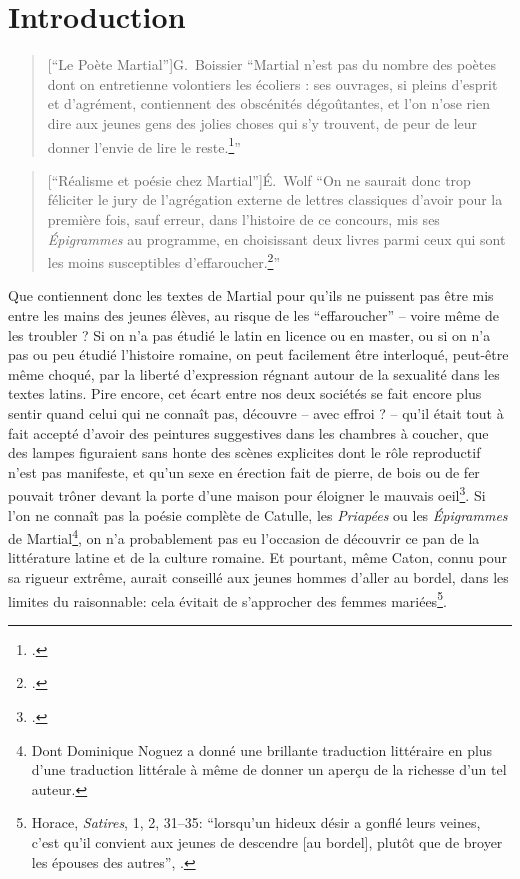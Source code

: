 \chapter*{Introduction}
\label{intro}

\begin{quote}[\enquote{Le Poète Martial}]{G.~Boissier}
    \enquote{Martial n’est pas du nombre des poètes dont on entretienne volontiers les écoliers : ses ouvrages, si pleins d’esprit et d’agrément, contiennent des obscénités dégoûtantes, et l’on n’ose rien dire aux jeunes gens des jolies choses qui s’y trouvent, de peur de leur donner l’envie de lire le reste.\footcite{boissier_poete_1900}}
\end{quote}

\begin{quote}[\enquote{Réalisme et poésie chez Martial}]{É.~Wolf}
    \enquote{On ne saurait donc trop féliciter le jury de l'agrégation externe de lettres classiques d'avoir pour la première fois, sauf erreur, dans l'histoire de ce concours, mis ses \textit{Épigrammes} au programme, en choisissant deux livres parmi ceux qui sont les moins susceptibles d'effaroucher.\footcite{wolff_realisme_1997}}
\end{quote}

Que contiennent donc les textes de Martial pour qu'ils ne puissent pas être mis entre les mains des jeunes élèves, au risque de les \enquote{effaroucher} -- voire même de les troubler ? Si on n'a pas étudié le latin en licence ou en master, ou si on n'a pas ou peu étudié l'histoire romaine, on peut facilement être interloqué, peut-être même choqué, par la liberté d'expression régnant autour de la sexualité dans les textes latins. Pire encore, cet écart entre nos deux sociétés se fait encore plus sentir quand celui qui ne connaît pas, découvre -- avec effroi ? -- qu'il était tout à fait accepté d'avoir des peintures suggestives dans les chambres à coucher, que des lampes figuraient sans honte des scènes explicites dont le rôle reproductif n'est pas manifeste, et qu'un sexe en érection fait de pierre, de bois ou de fer pouvait trôner devant la porte d'une maison pour éloigner le mauvais oeil\footcite{parker_bells_2018}. Si l'on ne connaît pas la poésie complète de Catulle, les \textit{Priapées} ou les \textit{Épigrammes} de Martial\footnote{Dont Dominique Noguez a donné une brillante traduction littéraire en plus d'une traduction littérale à même de donner un aperçu de la richesse d'un tel auteur.}, on n'a probablement pas eu l'occasion de découvrir ce pan de la littérature latine et de la culture romaine. Et pourtant, même Caton, connu pour sa rigueur extrême, aurait conseillé aux jeunes hommes d'aller au bordel, dans les limites du raisonnable: cela évitait de s'approcher des femmes mariées\footnote{Horace, \textit{Satires}, 1, 2, 31--35: \enquote{lorsqu'un hideux désir a gonflé leurs veines, c'est qu'il convient aux jeunes de descendre [au bordel], plutôt que de broyer les épouses des autres}, \textcite[p.~30]{puccini_delbey_vie_2010}.}.

